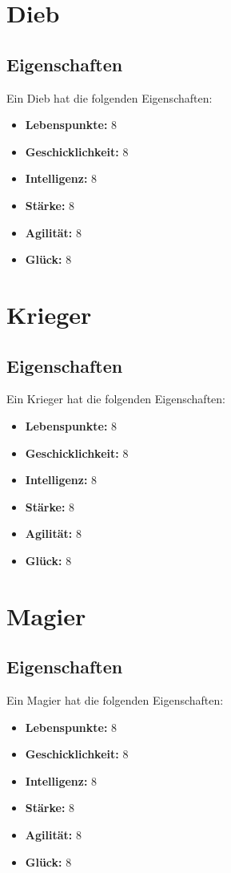 \documentclass[letterpaper,twocolumn,openany,nodeprecatedcode]{dndbook}
\begin{document}
\section{Dieb}
\subsection{Eigenschaften}
Ein Dieb hat die folgenden Eigenschaften:

\begin{itemize}
    \item \textbf{Lebenspunkte:} 8 
    \item \textbf{Geschicklichkeit:} 8 
    \item \textbf{Intelligenz:} 8 
    \item \textbf{Stärke:} 8 
    \item \textbf{Agilität:} 8 
    \item \textbf{Glück:} 8
\end{itemize}

\section{Krieger}
\subsection{Eigenschaften}
Ein Krieger hat die folgenden Eigenschaften:

\begin{itemize}
    \item \textbf{Lebenspunkte:} 8 
    \item \textbf{Geschicklichkeit:} 8 
    \item \textbf{Intelligenz:} 8 
    \item \textbf{Stärke:} 8 
    \item \textbf{Agilität:} 8 
    \item \textbf{Glück:} 8
\end{itemize}

\section{Magier}
\subsection{Eigenschaften}
Ein Magier hat die folgenden Eigenschaften:

\begin{itemize}
    \item \textbf{Lebenspunkte:} 8 
    \item \textbf{Geschicklichkeit:} 8 
    \item \textbf{Intelligenz:} 8 
    \item \textbf{Stärke:} 8 
    \item \textbf{Agilität:} 8 
    \item \textbf{Glück:} 8
\end{itemize}
\end{document}
